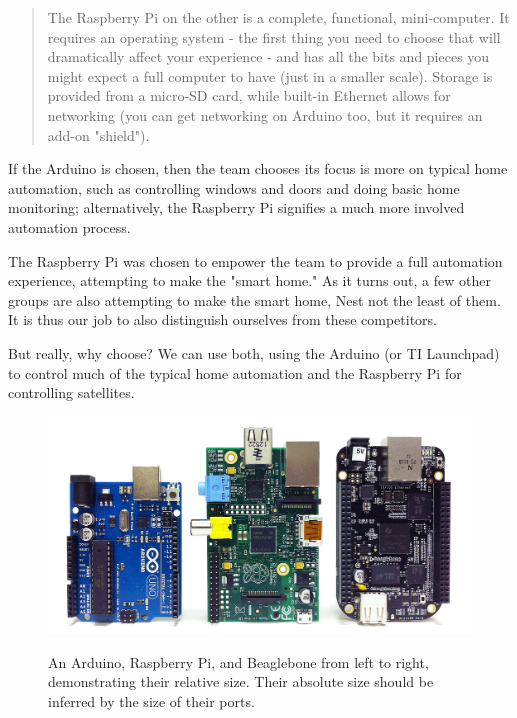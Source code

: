 \begin{multicols}{2}
\begin{quote}
			The Raspberry Pi on the other is a complete, functional, mini-computer. It requires an operating system - the first thing you need to choose that will dramatically affect your experience - and has all the bits and pieces you might expect a full computer to have (just in a smaller scale). Storage is provided from a micro-SD card, while built-in Ethernet allows for networking (you can get networking on Arduino too, but it requires an add-on "shield").
		\end{quote}
		
		If the Arduino is chosen, then the team chooses its focus is more on typical home automation, such as controlling windows and doors and doing basic home monitoring; alternatively, the Raspberry Pi signifies a much more involved automation process.
		
		The Raspberry Pi was chosen to empower the team to provide a full automation experience, attempting to make the "smart home."
		As it turns out, a few other groups are also attempting to make the smart home, Nest not the least of them.
		It is thus our job to also distinguish ourselves from these competitors.
		
		But really, why choose?
		We can use both, using the Arduino (or TI Launchpad) to control much of the typical home automation and the Raspberry Pi for controlling satellites.
		
\end{multicols}
\begin{figure}
	\centering
	\caption{An Arduino, Raspberry Pi, and Beaglebone from left to right, demonstrating their relative size.  Their absolute size should be inferred by the size of their ports.}
	\includegraphics[width=.9\textwidth]{gfx/pi-arduino-beaglebone.jpg}
	\label{fig:pi-arduino-beaglebone}
\end{figure}
